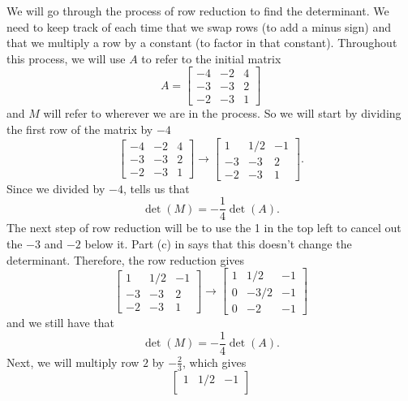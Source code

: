 \documentclass{ximera}
\begin{document}
\begin{exampleSol}
    We will go through the process of row reduction to find the determinant. We need to keep track of each time that we swap rows (to add a minus sign) and that we multiply a row by a constant (to factor in that constant). Throughout this process, we will use $A$ to refer to the initial matrix
    \[ 
        A = 
        \begin{bmatrix}  
            -4  & -2 & 4\\
            -3 & -3  & 2\\
            -2 &-3 & 1
        \end{bmatrix} 
    \] 
    and $M$ will refer to wherever we are in the process. So we will start by dividing the first row of the matrix by $-4$
    \[ 
        \begin{bmatrix}  
            -4  & -2 & 4\\
            -3 & -3  & 2\\
            -2 &-3 & 1
        \end{bmatrix}  
        \rightarrow 
        \begin{bmatrix}  
            1  & 1/2 & -1\\
            -3 & -3  & 2\\
            -2 &-3 & 1
        \end{bmatrix}. 
    \] 
    Since we divided by $-4$,  tells us that
    \[ 
        \det(M) = -\frac{1}{4} \det(A). 
    \]
    The next step of row reduction will be to use the 1 in the top left to cancel out the $-3$ and $-2$ below it. Part (c) in  says that this doesn't change the determinant. Therefore, the row reduction gives
    \[ 
        \begin{bmatrix}  
            1  & 1/2 & -1\\
            -3 & -3  & 2\\
            -2 &-3 & 1
        \end{bmatrix} 
        \rightarrow 
        \begin{bmatrix}  
            1  & 1/2 & -1\\
            0 & -3/2  & -1\\
            0 & -2 & -1
        \end{bmatrix} 
    \] 
    and we still have that
    \[ 
        \det(M) = -\frac{1}{4}\det(A). 
    \] 
    Next, we will multiply row $2$ by $-\frac{2}{3}$, which gives
    \[  
        \begin{bmatrix}  
            1  & 1/2 & -1\\

\end{bmatrix}\]
\end{exampleSol}
\end{document}
